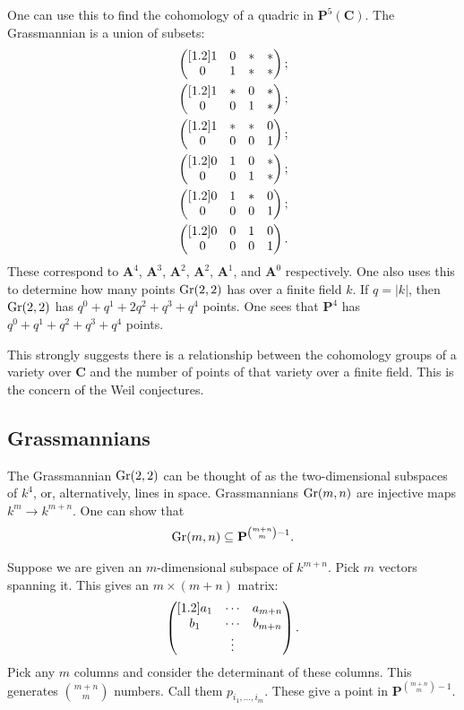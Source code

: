 \documentclass[11pt, oneside,margin=1in]{article}
\begin{document}
One can use this to find the cohomology of a quadric in $\mathbf{P}^5(\mathbf{C})$. The Grassmannian is a union of subsets:
\begin{align*}
	&\begin{pmatrix} [ 1.2 ] 1&0&*&*\\0&1&*&*\end{pmatrix};\\
	&\begin{pmatrix} [ 1.2 ] 1&*&0&*\\0&0&1&*\end{pmatrix};\\
	&\begin{pmatrix} [ 1.2 ] 1&*&*&0\\0&0&0&1\end{pmatrix};\\
	&\begin{pmatrix} [ 1.2 ] 0&1&0&*\\0&0&1&*\end{pmatrix};\\
	&\begin{pmatrix} [ 1.2 ] 0&1&*&0\\0&0&0&1\end{pmatrix};\\
	&\begin{pmatrix} [ 1.2 ] 0&0&1&0\\0&0&0&1\end{pmatrix}.
\end{align*}
These correspond to $\mathbf{A}^4$, $\mathbf{A}^3$, $\mathbf{A}^2$, $\mathbf{A}^2$, $\mathbf{A}^1$, and $\mathbf{A}^0$ respectively. One also uses this to determine how many points $\operatorname{Gr}(2,2)$ has over a finite field $k$. If $q=\left\lvert k \right\rvert $, then $\operatorname{Gr}(2,2)$ has $q^0 + q^1 + 2q^2 + q^3+q^4$ points. One sees that $\mathbf{P}^4$ has $q^0+q^1+q^2+q^3+q^4$ points.

This strongly suggests there is a relationship between the cohomology groups of a variety over $\mathbf{C}$ and the number of points of that variety over a finite field. This is the concern of the Weil conjectures.


\subsection{Grassmannians}

The Grassmannian $\operatorname{Gr}(2,2)$ can be thought of as the two-dimensional subspaces of $k^4$, or, alternatively, lines in space. Grassmannians $\operatorname{Gr}(m,n)$ are injective maps $k^m \longrightarrow k^{m+n}$.
One can show that
\begin{align*}
	\operatorname{Gr}(m,n) \subseteq  \mathbf{P}^{\binom{m+n}{m}-1}.
\end{align*}

Suppose we are given an $m$-dimensional subspace of $k^{m+n}$. Pick $m$ vectors spanning it. This gives an $m\times(m+n)$ matrix:
\begin{align*}
	\begin{pmatrix} [ 1.2 ] a_1&\cdots &a_{m+n}\\b_1&\cdots &b_{m+n}\\&\vdots\end{pmatrix}.
\end{align*}
Pick any $m$ columns and consider the determinant of these columns. This generates $\binom{m+n}{m}$ numbers. Call them $p_{{i_1},\hdots,{i_m}}$. These give a point in $\mathbf{P}^{\binom{m+n}{m} - 1}$. 
\end{document}
